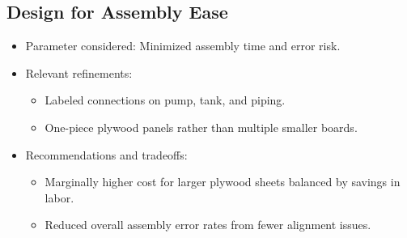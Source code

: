 \documentclass[12pt]{report}
\begin{document}
\subsection{Design for Assembly Ease}
\begin{itemize}[leftmargin=1.5cm]
    \item Parameter considered: Minimized assembly time and error risk.
    \item Relevant refinements:
    \begin{itemize}
        \item Labeled connections on pump, tank, and piping.
        \item One-piece plywood panels rather than multiple smaller boards.
    \end{itemize}
    \item Recommendations and tradeoffs:
    \begin{itemize}
        \item Marginally higher cost for larger plywood sheets balanced by savings in labor.
        \item Reduced overall assembly error rates from fewer alignment issues.
    \end{itemize}
\end{itemize}

\end{document}
